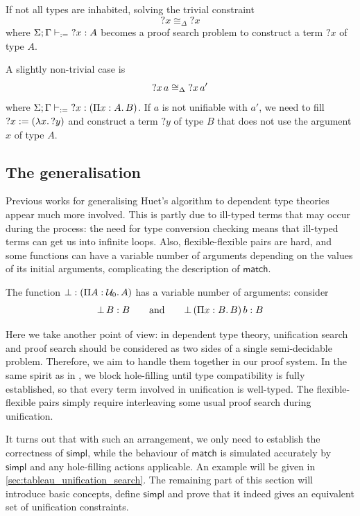 \documentclass[twoside]{report}
\begin{document}
\begin{example}
    If not all types are inhabited, solving the trivial constraint
    $${?x} \cong_\Delta {?x}$$
    where $\Sigma; \Gamma \vdash_{:=} {?x} : A$ becomes a proof search problem to construct a term ${?x}$ of type $A$.

    A slightly non-trivial case is
    $${?x}\,{a} \cong_\Delta {?x}\,{a}'$$
    where $\Sigma; \Gamma \vdash_{:=} {?x} : (\Pi{x} : {A}.\,{B})$. If $a$ is not unifiable with $a'$, we need to fill ${?x} := (\lambda{x}.\,{?y})$ and construct a term ${?y}$ of type $B$ that does not use the argument $x$ of type $A$.
\end{example}

\subsection*{The generalisation}

Previous works for generalising Huet's algorithm to dependent type theories \cite{pym1990proofs,elliott1990extensions} appear much more involved. This is partly due to ill-typed terms that may occur during the process: the need for type conversion checking means that ill-typed terms can get us into infinite loops. Also, flexible-flexible pairs are hard, and some functions can have a variable number of arguments depending on the values of its initial arguments, complicating the description of $\mathsf{match}$.

\begin{example}
    The function $\bot : (\Pi{A} : {\mathcal U_0}.\,{A})$ has a variable number of arguments: consider
    $${\bot}\,{B} : B \qquad \text{and} \qquad {{\bot}\,{(}\Pi{x} : {B}.\,{B})}\,{b} : B$$
\end{example}

Here we take another point of view: in dependent type theory, unification search and proof search should be considered as two sides of a single semi-decidable problem. Therefore, we aim to handle them together in our proof system. In the same spirit as in \cite{norell2007towards}, we block hole-filling until type compatibility is fully established, so that every term involved in unification is well-typed. The flexible-flexible pairs simply require interleaving some usual proof search during unification.

It turns out that with such an arrangement, we only need to establish the correctness of $\mathsf{simpl}$, while the behaviour of $\mathsf{match}$ is simulated accurately by $\mathsf{simpl}$ and any hole-filling actions applicable. An example will be given in \cref{sec:tableau_unification_search}. The remaining part of this section will introduce basic concepts, define $\mathsf{simpl}$ and prove that it indeed gives an equivalent set of unification constraints.
\end{document}
